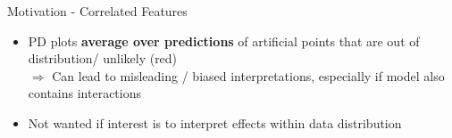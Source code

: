 \documentclass[10pt,compress,t,notes=noshow, xcolor=table]{beamer}
\begin{document}
\begin{frame}{Motivation - Correlated Features}
\begin{itemize}
    \item PD plots \textbf{average over predictions} of artificial points that are out of distribution/ unlikely (red)\\
    $\Rightarrow$ Can lead to misleading / biased interpretations, especially if model also contains interactions
    \item Not wanted if interest is to interpret effects within data distribution
\end{itemize}



\end{frame}
\end{document}
